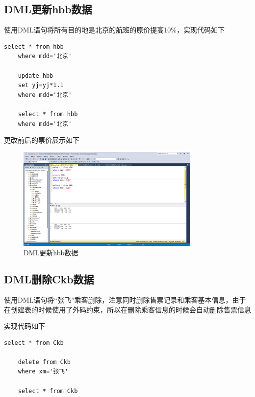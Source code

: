\documentclass[UTF8,12pt]{article}
\begin{document}
\subsection{DML更新hbb数据}
使用DML语句将所有目的地是北京的航班的原价提高10\%，实现代码如下
\begin{lstlisting}[title=DML更新hbb数据,frame=shadowbox]
    select * from hbb
    where mdd='北京'
    
    update hbb
    set yj=yj*1.1
    where mdd='北京'
    
    select * from hbb
    where mdd='北京'    
\end{lstlisting}

更改前后的票价展示如下
\begin{figure}[htbp]
    \centering
    \includegraphics[width=0.8\textwidth]{img/10.png}
    \caption{DML更新hbb数据}
\end{figure}

\subsection{DML删除Ckb数据}
使用DML语句将“张飞”乘客删除，注意同时删除售票记录和乘客基本信息，由于在创建表的时候使用了外码约束，所以在删除乘客信息的时候会自动删除售票信息

实现代码如下
\begin{lstlisting}[title=DML删除Ckb数据,frame=shadowbox]
    select * from Ckb
    
    delete from Ckb
    where xm='张飞'
    
    select * from Ckb
\end{lstlisting}
\end{document}
